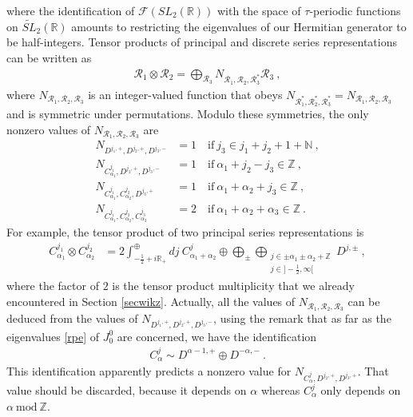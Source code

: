 \documentclass[12pt, a4paper, notitlepage, twoside]{report}
\numberwithin{equation}{section}
\theoremstyle{break}
\begin{document}
where the identification of $\mathcal{F}(SL_2(\mathbb{R}))$ with the space of $\tau$-periodic functions on $\widetilde{SL}_2(\mathbb{R})$ amounts to restricting the eigenvalues of our Hermitian generator to be half-integers.
Tensor products of principal and discrete series representations can be written as 
\begin{align}
 \mathcal{R}_1\otimes \mathcal{R}_2 = \bigoplus_{\mathcal{R}_3} N_{\mathcal{R}_1,\mathcal{R}_2,\mathcal{R}_3^*} \mathcal{R}_3\ ,
\label{ror}
\end{align}
where $N_{\mathcal{R}_1,\mathcal{R}_2,\mathcal{R}_3}$ is an integer-valued function that obeys $N_{\mathcal{R}_1^*,\mathcal{R}_2^*,\mathcal{R}_3^*}=N_{\mathcal{R}_1,\mathcal{R}_2,\mathcal{R}_3}$ and is symmetric under permutations.
Modulo these symmetries, the only nonzero values of $N_{\mathcal{R}_1,\mathcal{R}_2,\mathcal{R}_3}$ are
\begin{align}
N_{D^{j_1,+},D^{j_2,+},D^{j_3,-}} &= 1 \quad \text{if}\ j_3\in j_1+j_2+1+{\mathbb{N}}\ ,
\label{nddd}
\\
N_{C^{j_1}_{\alpha_1},D^{j_2,+},D^{j_3,-}} &= 1 \quad \text{if}\ \alpha_1+j_2-j_3\in{\mathbb{Z}}\ ,
\\
 N_{C^{j_1}_{\alpha_1},C^{j_2}_{\alpha_2},D^{j_3,+}} &= 1 \quad \text{if}\ \alpha_1+\alpha_2+j_3\in {\mathbb{Z}}\ ,
\\
N_{C^{j_1}_{\alpha_1},C^{j_2}_{\alpha_2},C^{j_3}_{\alpha_3}} &= 2 \quad \text{if}\ \alpha_1+\alpha_2+\alpha_3\in {\mathbb{Z}}\ .
\end{align}
For example, the tensor product of two principal series representations is
\begin{align}
 C^{j_1}_{\alpha_1}\otimes C^{j_2}_{\alpha_2} &= 2\int^\oplus_{-\frac12+i{\mathbb{R}}_+} dj\ C^j_{\alpha_1+\alpha_2} 
\oplus \bigoplus_\pm \bigoplus_{\substack{j\in \pm\alpha_1\pm\alpha_2+{\mathbb{Z}}\\ j\in]-\frac12, \infty[}} D^{j,\pm} \ ,
\label{coc}
\end{align}
where the factor of $2$ is the tensor product multiplicity that we already encountered in Section \ref{secwikz}.
Actually, all the values of $N_{\mathcal{R}_1,\mathcal{R}_2,\mathcal{R}_3}$ can be deduced from the values of $N_{D^{j_1,+},D^{j_2,+},D^{j_3,-}}$, using the remark that as far as the eigenvalues \eqref{rpe} of $J^0_0$ are concerned, we have the identification
\begin{align}
 C^j_\alpha \sim D^{\alpha-1,+} \oplus D^{-\alpha,-}\ .
\label{cjdd}
\end{align}
This identification apparently predicts a nonzero value for $N_{C^j_\alpha,D^{j_2,+},D^{j_3,+}}$.
That value should be discarded, because it depends on $\alpha$ whereas $C^j_\alpha$ only depends on $\alpha\ \text{mod}\ {\mathbb{Z}}$.
\end{document}
